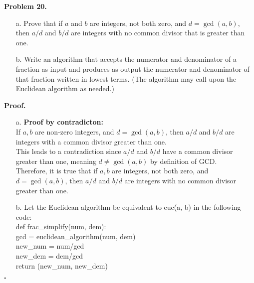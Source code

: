 \documentclass{article}
\newenvironment{problem}[1]{
    \begin{mdframed}[backgroundcolor=gray!20, skipabove=\baselineskip, skipbelow=\baselineskip, nobreak=true, innerleftmargin=10pt, innerrightmargin=10pt, innertopmargin=10pt, innerbottommargin=10pt]
    \textbf{Problem #1.}
}{
    \end{mdframed}
}
\newenvironment{proof}{
    \begin{mdframed}[nobreak=false, innerleftmargin=10pt, innerrightmargin=10pt, innertopmargin=10pt, innerbottommargin=10pt]
    \textbf{Proof.}
}{
    \hfill $\square$
    \end{mdframed}
}
\begin{document}
    \begin{problem}{20}
        \begin{enumerate}
            \item[a.] Prove that if $a$ and $b$ are integers, not both zero, and $d = \gcd(a,b)$, then $a/d$ and $b/d$ are integers with no common divisor that is greater than one.
            \item[b.] Write an algorithm that accepts the numerator and denominator of a fraction as input and produces as output the numerator and denominator of that fraction written in lowest terms. (The algorithm may call upon the Euclidean algorithm as needed.)
        \end{enumerate}
    \end{problem}
    \begin{proof}
        \begin{enumerate}
            \item[a.]
                \textbf{Proof by contradicton:} \\
                If $a, b$ are non-zero integers, and $d = \gcd(a, b)$, then $a/d$ and $b/d$ are integers with a common divisor greater than one. \\
                This leads to a contradiction since $a/d$ and $b/d$ have a common divisor greater than one, meaning $d\neq \gcd(a, b)$ by definition of GCD. \\
                Therefore, it is true that if $a, b$ are integers, not both zero, and $d = \gcd(a, b)$, then $a/d$ and $b/d$ are integers with no common divisor greater than one.
            \item[b.]
                Let the Euclidean algorithm be equivalent to euc(a, b) in the following code: \\
                def frac\_simplify(num, dem): \\
                    gcd = euclidean\_algorithm(num, dem) \\
                    new\_num = num/gcd \\
                    new\_dem = dem/gcd \\
                    return (new\_num, new\_dem)
        \end{enumerate}
    \end{proof}
\end{document}
